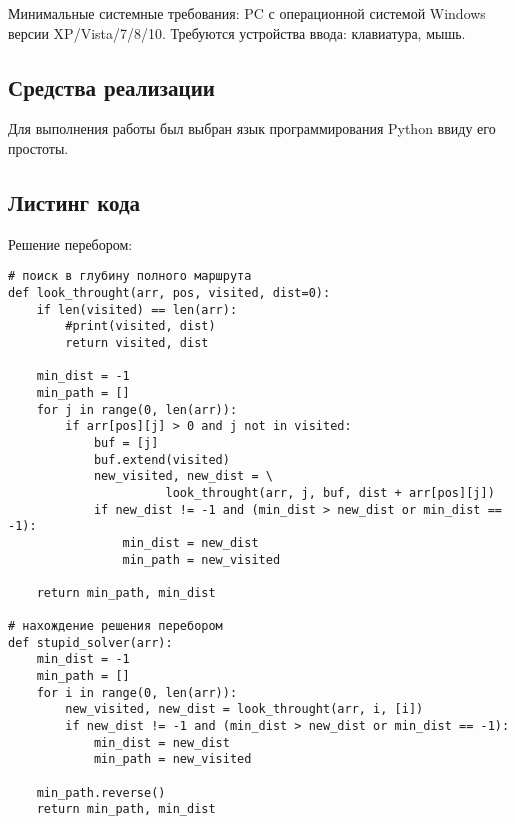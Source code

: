 \documentclass[12pt,a4paper]{scrartcl}
\begin{document}
Минимальные системные требования: PC с операционной системой Windows версии XP/Vista/7/8/10. Требуются устройства ввода: клавиатура, мышь. 

\subsection{Средства реализации}

Для выполнения работы был выбран язык программирования Python ввиду его простоты.

\subsection{Листинг кода}   

Решение перебором:
\begin{verbatim}
# поиск в глубину полного маршрута
def look_throught(arr, pos, visited, dist=0):
    if len(visited) == len(arr):
        #print(visited, dist)
        return visited, dist

    min_dist = -1
    min_path = []
    for j in range(0, len(arr)):
        if arr[pos][j] > 0 and j not in visited:
            buf = [j]
            buf.extend(visited)
            new_visited, new_dist = \
                      look_throught(arr, j, buf, dist + arr[pos][j])
            if new_dist != -1 and (min_dist > new_dist or min_dist == -1):
                min_dist = new_dist
                min_path = new_visited

    return min_path, min_dist

# нахождение решения перебором
def stupid_solver(arr):
    min_dist = -1
    min_path = []
    for i in range(0, len(arr)):
        new_visited, new_dist = look_throught(arr, i, [i])
        if new_dist != -1 and (min_dist > new_dist or min_dist == -1):
            min_dist = new_dist
            min_path = new_visited

    min_path.reverse()
    return min_path, min_dist
\end{verbatim}
\end{document}
